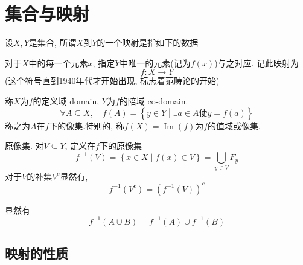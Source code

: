 \section{集合与映射}
\begin{definition}
    设$X, Y$是集合, 所谓$X$到$Y$的一个映射是指如下的数据
    
    对于$X$中的每一个元素$x$, 指定$Y$中唯一的元素(记为$f(x)$)与之对应.
    记此映射为
    \begin{equation}
      f \colon X \rightarrow Y
    \end{equation}
    (这个符号直到1940年代才开始出现, 标志着范畴论的开始)

    称$X$为$f$的定义域 domain, $Y$为$f$的陪域 co-domain.
    \begin{equation}
      \forall A \subseteq X, \quad f(A) = \left\{ y \in Y \middle|\exists a \in A \text{使} y= f(a) \right\} 
    \end{equation}
    称之为$A$在$f$下的像集.特别的, 称$f(X) = \operatorname{Im}(f)$为$f$的值域或像集.
\end{definition}

\begin{definition}
    原像集. 对$V \subseteq Y$, 定义在$f$下的原像集
    \begin{equation}
        f^{-1}(V) = \left\{ x \in X \middle| f(x) \in V \right\}
        = \bigcup_{y \in V} F_{y}
    \end{equation}
    对于$V$的补集$V^c$显然有,
    \begin{equation}
      f^{-1}(V^c) = \left( f^{-1}(V) \right) ^c
    \end{equation}

\end{definition}
显然有
\begin{equation}
  f^{-1} \left( A \cup B \right) = f^{-1}(A) \cup f^{-1}(B)
\end{equation}

\subsection{映射的性质}

